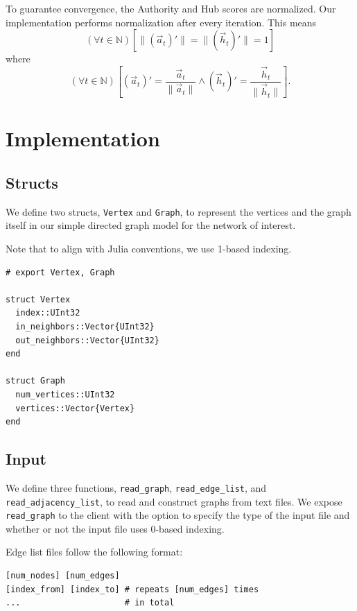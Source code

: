 \documentclass[12pt, titlepage, twoside]{amsart}
\newcommand{\N}{\ensuremath{\mathbb N}}
\begin{document}
To guarantee convergence, the Authority and Hub scores are normalized.
Our implementation performs normalization after every iteration.
This means
\[
  (\forall t\in\N)
  \left[
    \lVert(\vec{a}_t)'\rVert = \lVert(\vec{h}_t)'\rVert = 1
  \right]
\]
where
\[
  (\forall t\in\N)
  \left[
    (\vec{a}_t)' = \frac{\vec{a}_t}{\lVert\vec{a}_t\rVert}
    \wedge
    (\vec{h}_t)' = \frac{\vec{h}_t}{\lVert\vec{h}_t\rVert}
  \right].
\]

\section{Implementation}

\subsection{Structs}

We define two structs, \texttt{Vertex} and \texttt{Graph}, to represent
the vertices and the graph itself in our simple directed graph model for the network of interest.

Note that to align with Julia conventions, we use 1-based indexing.~\cite{julialang}

\begin{verbatim}
# export Vertex, Graph

struct Vertex
  index::UInt32
  in_neighbors::Vector{UInt32}
  out_neighbors::Vector{UInt32}
end

struct Graph
  num_vertices::UInt32
  vertices::Vector{Vertex}
end
\end{verbatim}

\subsection{Input}

We define three functions,
\texttt{read_graph}, \texttt{read_edge_list}, and \texttt{read_adjacency_list},
to read and construct graphs from text files.
We expose \texttt{read_graph} to the client with the option to specify the type of the input file and
whether or not the input file uses 0-based indexing.

Edge list files follow the following format:

\begin{verbatim}
[num_nodes] [num_edges]
[index_from] [index_to] # repeats [num_edges] times
...                     # in total
\end{verbatim}
\end{document}
